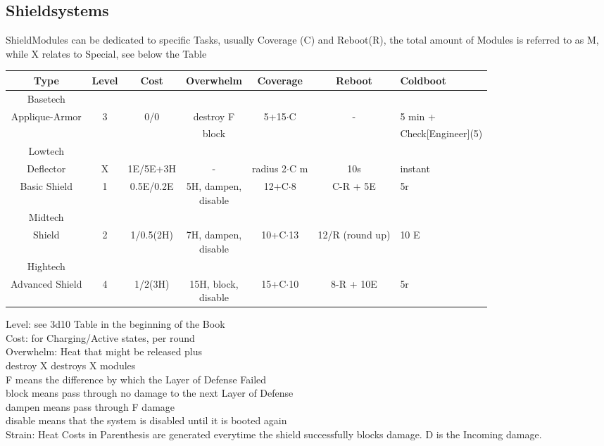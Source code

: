 \subsection{Shieldsystems}
ShieldModules can be dedicated to specific Tasks, usually
Coverage (C) and Reboot(R), the total amount of Modules is referred to as M, while
X relates to Special, see below the Table\newline
\begin{tabular}{c|cccccl}
    Type & Level & Cost & Overwhelm & Coverage & Reboot & Coldboot \\
    \hline Basetech\\
    Applique-Armor & 3 & 0/0 & destroy F& 5+15\(\cdot\)C & -  & 5 min + \\
    &&&block&&& Check[Engineer](5) \\
    \hline Lowtech\\
    Deflector & X & 1E/5E+3H & - & radius 2\(\cdot\)C m & 10s & instant \\
    Basic Shield & 1 & 0.5E/0.2E & \makecell{5H, dampen, \\ disable}&12+C\(\cdot\)8 & C-R + 5E & 5r \\
    \hline Midtech\\
    Shield & 2 & 1/0.5(2H) & \makecell{7H, dampen,\\ disable} & 10+C\(\cdot\)13 & 12/R (round up) & 10 E \\
    \hline Hightech\\
    Advanced Shield & 4 & 1/2(3H) & \makecell{15H, block,\\ disable}& 15+C\(\cdot\)10 & 8-R + 10E & 5r \\
\end{tabular}\newline\newline\newline
Level: see 3d10 Table in the beginning of the Book\\
Cost: for Charging/Active states, per round\\
Overwhelm: Heat that might be released plus \\
\tab destroy X destroys X modules\\
\tab F means the difference by which the Layer of Defense Failed\\
\tab block means pass through no damage to the next Layer of Defense\\
\tab dampen means pass through F damage\\
\tab disable means that the system is disabled until it is booted again\\
\newline
Strain: Heat Costs in Parenthesis are generated everytime the shield successfully blocks damage.
D is the Incoming damage.
\pagebreak[2]
